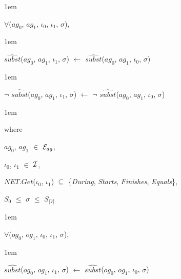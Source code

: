 \documentclass[11pt]{report}
\newenvironment{vquote}
{
  \begin{list}{}{\leftmargin 1em}\item[]
}
{
  \end{list}
}
\begin{document}
\begin{enumerate}
                \vspace{0.5em}

                \begin{vquote}
                  $\forall$($ag_0$, $ag_1$, $\iota_0$, $\iota_1$, $\sigma$),
                \end{vquote}

                \begin{vquote}
                  $\hat{subst}$($ag_0$, $ag_1$, $\iota_1$, $\sigma$)
                  $\leftarrow$
                  $\hat{subst}$($ag_0$, $ag_1$, $\iota_0$, $\sigma$)
                \end{vquote}

                \begin{vquote}
                  $\lnot$ $\hat{subst}$($ag_0$, $ag_1$, $\iota_1$, $\sigma$)
                  $\leftarrow$
                  $\lnot$ $\hat{subst}$($ag_0$, $ag_1$, $\iota_0$, $\sigma$)
                \end{vquote}

                \begin{vquote}
                  where

                  \hspace{1em}
                  $ag_0$, $ag_1$ $\in$ ${\cal E}_{ag}$,

                  \hspace{1em}
                  $\iota_0$, $\iota_1$ $\in$ ${\cal I}$,

                  \hspace{1em}
                  $NET.Get$($\iota_0$, $\iota_1$) $\subseteq$
                  \{{\em During}, {\em Starts}, {\em Finishes}, {\em Equals}\},

                  \hspace{1em}
                  $S_0$ $\leq$ $\sigma$ $\leq$ $S_{|V|}$
                \end{vquote}

                \vspace{0.5em}

                \begin{vquote}
                  $\forall$($og_0$, $og_1$, $\iota_0$, $\iota_1$, $\sigma$),
                \end{vquote}

                \begin{vquote}
                  $\hat{subst}$($og_0$, $og_1$, $\iota_1$, $\sigma$)
                  $\leftarrow$
                  $\hat{subst}$($og_0$, $og_1$, $\iota_0$, $\sigma$)
                \end{vquote}


\end{enumerate}
\end{document}
